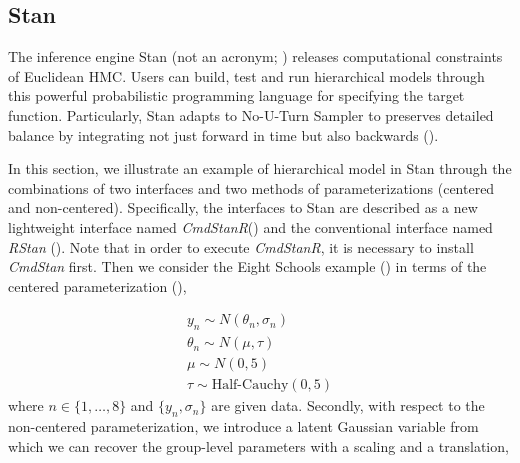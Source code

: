 



\subsection{Stan}

The inference engine Stan (not an acronym; \cite{StanManual}) releases computational constraints of Euclidean HMC. Users can build, test and run hierarchical models through this powerful probabilistic programming language for specifying the target function. Particularly, Stan adapts to No-U-Turn Sampler to preserves detailed balance by integrating not just forward in time but also backwards (\cite{Hoffman2011}). 


In this section, we illustrate an example of hierarchical model in Stan through the combinations of two interfaces and two methods of parameterizations (centered and non-centered). Specifically, the interfaces to Stan are described as a new lightweight interface named \emph{CmdStanR}(\cite{Gabry2022}) and the conventional interface named \emph{RStan} (\cite{Rstan2020}). Note that in order to execute \emph{CmdStanR}, it is necessary to install \emph{CmdStan} first. Then we consider the Eight Schools example (\cite{Rubin1981}) in terms of the centered parameterization (\cite{Betancourt2017}), 

\begin{gather*} 
    y_n \sim N(\theta_n, \sigma_n)\\
    \theta_n \sim N(\mu, \tau)\\
    \mu \sim N(0,5) \\
    \tau \sim \mbox{Half-Cauchy}(0,5)
\end{gather*}
where $n \in \{1,\dots,8\}$ and $\{y_n, \sigma_n\}$ are given data. Secondly,  with respect to the non-centered parameterization, we introduce a latent Gaussian variable from which we can recover the group-level parameters with a scaling and a translation,

